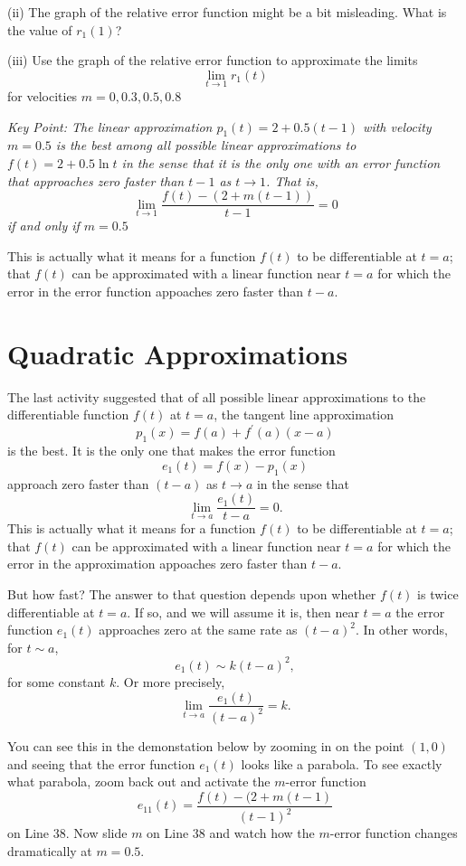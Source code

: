 \documentclass{ximera}
\begin{document}
\begin{exploration}
\begin{question}
(ii) The graph of the relative error function might be a bit misleading. What is the value of $r_1(1)$?

(iii) Use the graph of the relative error function to approximate the limits
\[
    \lim_{t\to 1}r_1(t) 
\]
for velocities $m=0, 0.3, 0.5, 0.8$
\end{question}

\it{Key Point:} The linear approximation $p_1(t)=2+0.5(t-1)$ with velocity $m=0.5$ is the best among all possible linear approximations to $f(t)=2+0.5\ln t$ in the sense that it is the \emph{only} one with an error function that approaches zero faster than $t-1$ as $t\to 1$. That is,
\[
          \lim_{t\to 1} \frac{f(t) - (2 + m(t-1))}{t-1} = 0
\]
if and only if $m=0.5$

This is actually what it means for a function $f(t)$ to be differentiable at $t=a$; that $f(t)$ can be approximated with a linear function near $t=a$ for which the error in the error function appoaches zero faster than $t-a$. 




\end{exploration}




\section{Quadratic Approximations}
The last activity suggested that of all possible linear approximations to the differentiable function $f(t)$ at $t=a$, the tangent line approximation
\[
 p_1(x) = f(a) + f^\prime(a)(x-a)
\]
is the best. It is the only one that makes the error function
\[
   e_1(t) = f(x) - p_1(x)
\]
approach zero faster than $(t-a)$ as $t\to a$ in the sense that
\[
   \lim_{t\to a} \frac{e_1(t)}{t-a} = 0 .
\]
This is actually what it means for a function $f(t)$ to be differentiable at $t=a$; that $f(t)$ can be approximated with a linear function near $t=a$ for which the error in the approximation appoaches zero faster than $t-a$. 

But how fast? The answer to that question depends upon whether $f(t)$ is twice differentiable at $t=a$. If so, and we will assume it is, then near $t=a$ the error function $e_1(t)$ approaches zero at the same rate as $(t-a)^2$. In other words, for $t\sim a$,
\[
  e_1(t) \sim k (t-a)^2 ,
\]
for some constant $k$. Or more precisely, 
\[
   \lim_{t\to a} \frac{e_1(t)}{(t-a)^2} = k .
\]

You can see this in the demonstation below by zooming in on the point $(1,0)$ and seeing that the error function $e_1(t)$ looks like a parabola. To see exactly what parabola, zoom back out and activate the $m$-error function 
\[
   e_{11}(t) = \frac{f(t) - (2+m(t-1)}{(t-1)^2}
\]
on Line 38. Now slide $m$ on Line 38 and watch how the $m$-error function changes dramatically at $m=0.5$.
\end{document}

